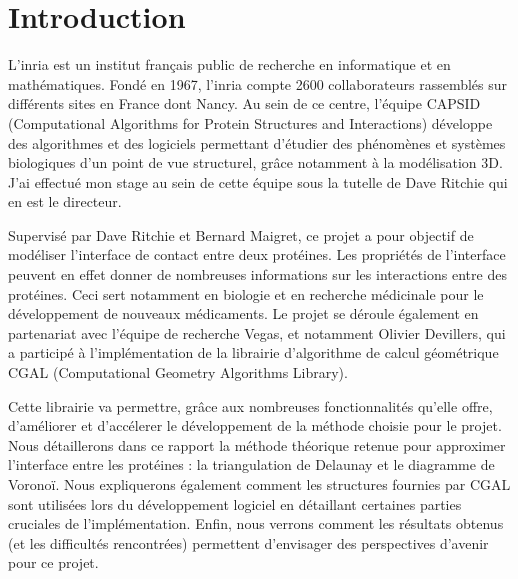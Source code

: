 \chapter*{Introduction}

  L'\gls{inria} est un
  institut français public de recherche en informatique et en mathématiques. Fondé
  en 1967, l'\gls{inria} compte 2600 collaborateurs rassemblés sur différents sites en
  France dont Nancy. Au sein de ce centre, l'équipe CAPSID (Computational Algorithms for
  Protein Structures and Interactions)
   développe des algorithmes
  et des logiciels permettant d'étudier des phénomènes et systèmes biologiques
  d'un point de vue structurel, grâce notamment à la modélisation 3D. J'ai effectué
  mon stage au sein de cette équipe sous la tutelle de Dave Ritchie qui en est le
  directeur.

  Supervisé par Dave Ritchie et Bernard Maigret, ce projet a pour objectif de
  modéliser l'interface de contact entre deux protéines. Les propriétés de l'interface
  peuvent en effet donner de nombreuses informations sur les interactions entre
  des protéines. Ceci sert notamment en biologie et en recherche médicinale pour
  le développement de nouveaux médicaments.
  Le projet se déroule également en partenariat avec l'équipe de recherche Vegas, et
  notamment Olivier Devillers, qui a participé à l'implémentation de
  la librairie d'algorithme de calcul géométrique CGAL (Computational Geometry
  Algorithms Library).

  Cette librairie va permettre, grâce aux nombreuses fonctionnalités qu'elle offre,
  d'améliorer et d'accélerer le développement de la méthode choisie pour le projet.
  Nous détaillerons dans ce rapport la méthode théorique retenue pour approximer l'interface
  entre les protéines : la triangulation de Delaunay et le diagramme de Voronoï. Nous
  expliquerons également comment les structures fournies par CGAL sont utilisées lors
  du développement logiciel en détaillant certaines parties cruciales de l'implémentation.
  Enfin, nous verrons comment les résultats obtenus (et les difficultés rencontrées)
  permettent d'envisager des perspectives d'avenir pour ce projet.
